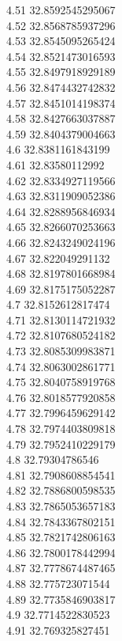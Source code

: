 {4.51	32.8592545295067\\
4.52	32.8568785937296\\
4.53	32.8545095265424\\
4.54	32.8521473016593\\
4.55	32.8497918929189\\
4.56	32.8474432742832\\
4.57	32.8451014198374\\
4.58	32.8427663037887\\
4.59	32.8404379004663\\
4.6	32.8381161843199\\
4.61	32.83580112992\\
4.62	32.8334927119566\\
4.63	32.8311909052386\\
4.64	32.8288956846934\\
4.65	32.8266070253663\\
4.66	32.8243249024196\\
4.67	32.822049291132\\
4.68	32.8197801668984\\
4.69	32.8175175052287\\
4.7	32.8152612817474\\
4.71	32.8130114721932\\
4.72	32.8107680524182\\
4.73	32.8085309983871\\
4.74	32.8063002861771\\
4.75	32.8040758919768\\
4.76	32.8018577920858\\
4.77	32.7996459629142\\
4.78	32.7974403809818\\
4.79	32.7952410229179\\
4.8	32.79304786546\\
4.81	32.7908608854541\\
4.82	32.7886800598535\\
4.83	32.7865053657183\\
4.84	32.7843367802151\\
4.85	32.7821742806163\\
4.86	32.7800178442994\\
4.87	32.7778674487465\\
4.88	32.775723071544\\
4.89	32.7735846903817\\
4.9	32.7714522830523\\
4.91	32.769325827451\\
}
